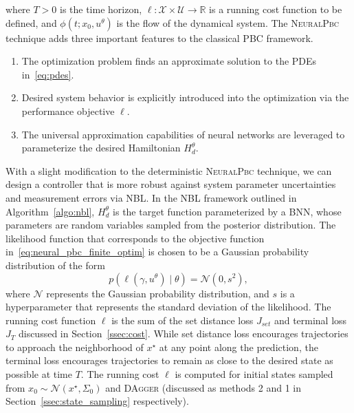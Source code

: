 where $T>0$ is the time horizon, $\ell: \mathcal{X} \times \mathcal{U}
\rightarrow \mathbb{R}$ is a running cost function to be defined, and $\phi(t;
x_0, u^\theta)$ is the flow of the dynamical system.
%
The \textsc{NeuralPbc} technique adds three important features to the classical 
PBC framework.
\begin{enumerate}
  \item The optimization problem finds an approximate solution to the PDEs in~\eqref{eq:pdes}.
  \item Desired system behavior is explicitly introduced into the optimization via the performance objective $\ell$.
  \item The universal approximation capabilities of neural networks are leveraged to parameterize the desired Hamiltonian $H^\theta_d$.
\end{enumerate}

 
%
With a slight modification to the deterministic \textsc{NeuralPbc} technique, we
can design a controller that is more robust against system parameter
uncertainties and measurement errors via NBL.
%
In the NBL framework outlined in Algorithm~\ref{algo:nbl}, $H^\theta_d$ is the
target function parameterized by a BNN, whose parameters are random variables
sampled from the posterior distribution.
%
The likelihood function that corresponds to the objective function
in~\eqref{eq:neural_pbc_finite_optim} is chosen to be a Gaussian probability
distribution of the form
\begin{equation}
    p(\ell(\gamma, u^\theta) \mid \theta) = \mathcal{N}\left(0, s^2 \right),
    \label{eqn:likelihood_neuralpbc}
\end{equation}
where $\mathcal{N}$ represents the Gaussian probability distribution, and $s$ is
a hyperparameter that represents the standard deviation of the likelihood. The
running cost function $\ell$ is the sum of the set distance loss $J_{set}$ and terminal
loss $J_T$ discussed in Section~\ref{ssec:cost}. While set distance loss
encourages trajectories to approach the neighborhood of $x^\star$ at any point
along the prediction, the terminal loss encourages trajectories to remain as
close to the desired state as possible at time $T$.
%
The running cost $\ell$ is computed for initial states sampled from $x_0 \sim
\mathcal{N}(x^\star, \Sigma_0)$ and \textsc{DAgger} (discussed as methods 2 and
1 in Section~\ref{ssec:state_sampling} respectively).

